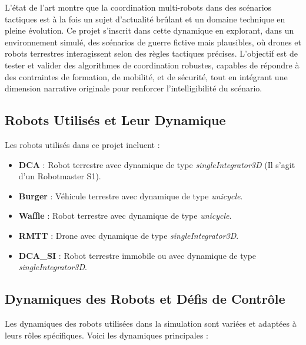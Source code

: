 \documentclass[a4paper,12pt]{article}
\begin{document}
L’état de l’art montre que la coordination multi-robots dans des scénarios tactiques est à la fois un sujet d’actualité brûlant et un domaine technique en pleine évolution. Ce projet s’inscrit dans cette dynamique en explorant, dans un environnement simulé, des scénarios de guerre fictive mais plausibles, où drones et robots terrestres interagissent selon des règles tactiques précises. L’objectif est de tester et valider des algorithmes de coordination robustes, capables de répondre à des contraintes de formation, de mobilité, et de sécurité, tout en intégrant une dimension narrative originale pour renforcer l’intelligibilité du scénario.


\subsection*{Robots Utilisés et Leur Dynamique}
Les robots utilisés dans ce projet incluent :
\begin{itemize}
    \item \textbf{DCA} : Robot terrestre avec dynamique de type \textit{singleIntegrator3D} (Il s'agit d'un Robotmaster S1).
    \item \textbf{Burger} : Véhicule terrestre avec dynamique de type \textit{unicycle}.
    \item \textbf{Waffle} : Robot terrestre avec dynamique de type \textit{unicycle}.
    \item \textbf{RMTT} : Drone avec dynamique de type \textit{singleIntegrator3D}.
    \item \textbf{DCA\_SI} : Robot terrestre immobile ou avec dynamique de type \textit{singleIntegrator3D}.
\end{itemize}

\subsection*{Dynamiques des Robots et Défis de Contrôle}
Les dynamiques des robots utilisées dans la simulation sont variées et adaptées à leurs rôles spécifiques. Voici les dynamiques principales :
\end{document}

